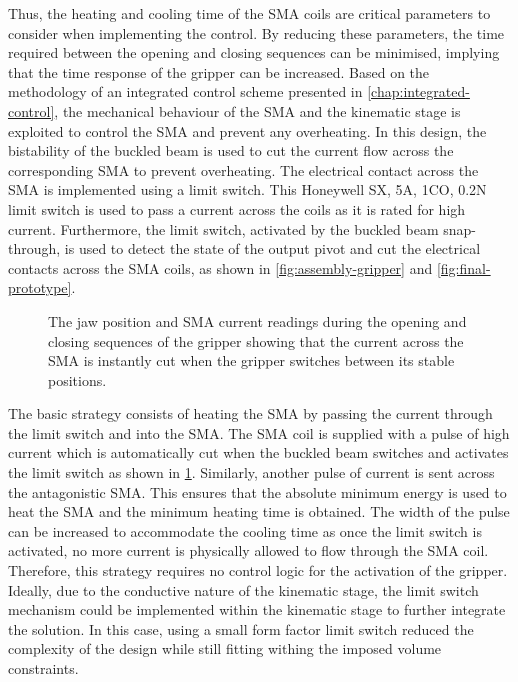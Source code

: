 Thus, the heating and cooling time of the SMA coils are critical parameters to consider when implementing the control. By reducing these parameters, the time required between the opening and closing sequences can be minimised, implying that the time response of the gripper can be increased. Based on the methodology of an integrated control scheme presented in \cref{chap:integrated-control}, the mechanical behaviour of the SMA and the kinematic stage is exploited to control the SMA and prevent any overheating. In this design, the bistability of the buckled beam is used to cut the current flow across the corresponding SMA to prevent overheating. The electrical contact across the SMA is implemented using a limit switch. This Honeywell SX, 5A, 1CO, 0.2N limit switch is used to pass a current across the coils as it is rated for high current. Furthermore, the limit switch, activated by the buckled beam snap-through, is used to detect the state of the output pivot and cut the electrical contacts across the SMA coils, as shown in \cref{fig:assembly-gripper} and \cref{fig:final-prototype}.
\begin{figure}[hbt!] %
    \centering
  \caption{The jaw position and SMA current readings during the opening and closing sequences of the gripper showing that the current across the SMA is instantly cut when the gripper switches between its stable positions.}
  \label{fig:smabb-actuation}
\end{figure}

The basic strategy consists of heating the SMA by passing the current through the limit switch and into the SMA. The SMA coil is supplied with a pulse of high current which is automatically cut when the buckled beam switches and activates the limit switch as shown in \cref{fig:smabb-actuation}. Similarly, another pulse of current is sent across the antagonistic SMA. This ensures that the absolute minimum energy is used to heat the SMA and the minimum heating time is obtained. The width of the pulse can be increased to accommodate the cooling time as once the limit switch is activated, no more current is physically allowed to flow through the SMA coil. Therefore, this strategy requires no control logic for the activation of the gripper. Ideally, due to the conductive nature of the kinematic stage, the limit switch mechanism could be implemented within the kinematic stage to further integrate the solution. In this case, using a small form factor limit switch reduced the complexity of the design while still fitting withing the imposed volume constraints.

